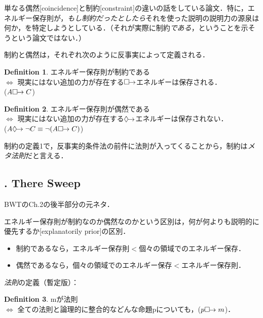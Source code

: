 \documentclass[dvipdfmx,twoside,11pt,uplatex]{jsarticle}
\theoremstyle{definition}
\newtheorem{dfn}{Definition}
\begin{document}
単なる偶然[coincidence]と制約[constraint]の違いの話をしている論文．特に，エネルギー保存則が，\emph{もし制約だったとしたら}それを使った説明の説明力の源泉は何か，を特定しようとしている．（それが実際に制約\emph{である}，ということを示そうという論文ではない．）


制約と偶然は，それぞれ次のように反事実によって定義される．
\begin{dfn}
エネルギー保存則が制約である\\
$\Longleftrightarrow$
現実にはない追加の力が存在する$\Box\hspace{-4pt}\rightarrow$エネルギーは保存される．\\
($A\Box\hspace{-4pt}\rightarrow C$)
\end{dfn}
\begin{dfn}
エネルギー保存則が偶然である\\
$\Longleftrightarrow$
現実にはない追加の力が存在する$\Diamond\hspace{-4pt}\rightarrow$エネルギーは保存されない．\\
($A\Diamond\hspace{-4pt}\rightarrow\lnot C\equiv \lnot(A\Box\hspace{-4pt}\rightarrow C)$)
\end{dfn}
制約の定義1で，反事実的条件法の前件に法則が入ってくることから，制約は\emph{メタ法則}だと言える\citep[170]{Lange2012}．

\subsection{\cite{Lange2012}. There Sweep}
BWTのCh.2の後半部分の元ネタ．

エネルギー保存則が制約なのか偶然なのかという区別は，何が何よりも説明的に優先するか[explanatorily prior]の区別\citep[157]{Lange2012}．
\begin{itemize}
	\item 制約であるなら，エネルギー保存則$<$個々の領域でのエネルギー保存．
	\item 偶然であるなら，個々の領域でのエネルギー保存$<$エネルギー保存則．
\end{itemize}

\emph{法則}の定義（暫定版）\citep[171--2]{Lange2012}：
\begin{dfn}
mが法則\\
$\Longleftrightarrow$ 全ての法則と論理的に整合的などんな命題pについても，($p\Box\hspace{-4pt}\rightarrow m$)．
\end{dfn}
\end{document}
